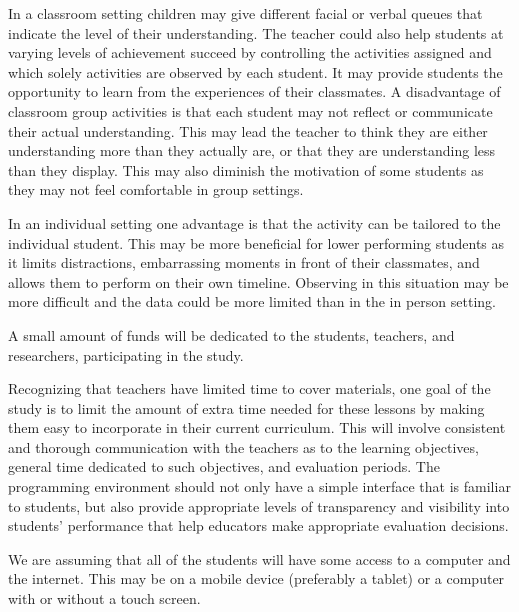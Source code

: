 In a classroom setting children may give different facial or verbal queues that indicate the level of their understanding. The teacher could also help students at varying levels of achievement succeed by controlling the activities assigned and which solely activities are observed by each student. It may provide students the opportunity to learn from the experiences of their classmates. A disadvantage of classroom group activities is that each student may not reflect or communicate their actual understanding. This may lead the teacher to think they are either understanding more than they actually are, or that they are understanding less than they display. This may also diminish the motivation of some students as they may not feel comfortable in group settings. 

In an individual setting one advantage is that the activity can be tailored to the individual student. This may be more beneficial for lower performing students as it limits distractions, embarrassing moments in front of their classmates, and allows them to perform on their own timeline. Observing in this situation may be more difficult and the data could be more limited than in the in person setting. 

A small amount of funds will be dedicated to the students, teachers, and researchers, participating in the study. 

Recognizing that teachers have limited time to cover materials, one goal of the study is to limit the amount of extra time needed for these lessons by making them easy to incorporate in their current curriculum. This will involve consistent and thorough communication with the teachers as to the learning objectives, general time dedicated to such objectives, and evaluation periods. 
The programming environment should not only have a simple interface that is familiar to students, but also provide appropriate levels of transparency and visibility into students' performance that help educators make appropriate evaluation decisions.

We are assuming that all of the students will have some access to a computer and the internet. This may be on a mobile device (preferably a tablet) or a computer with or without a touch screen.



